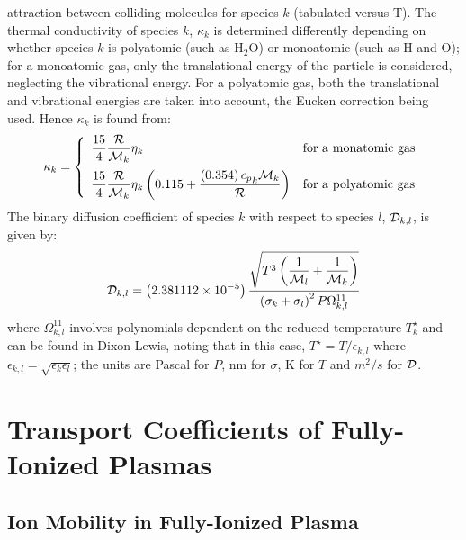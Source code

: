 \documentclass{warpdoc}
\newcommand{\cp}{{c_p}}
\newcommand{\mfd}{\displaystyle}
\begin{document}
attraction between colliding molecules for species $k$ (tabulated
versus T). The thermal conductivity of species $k$, $\kappa_k$ is determined
differently depending on whether
species $k$ is polyatomic (such as H$_2$O) or monoatomic
(such as H and O); for a monoatomic gas, only the
translational energy of the particle is considered,
neglecting the vibrational energy. For a polyatomic gas,
both the translational and vibrational energies are taken into
account, the Eucken correction being used. Hence $\kappa_k$
is found from:
%
\begin{equation}
\kappa_k = \left\{ \begin{array}{ll}
\vspace{0.2cm}
\mfd\frac{15}{4} \mfd\frac{\cal R}{{\cal M}_k} \eta_k & {\rm for~a~monatomic~gas} \\
\mfd\frac{15}{4} \mfd\frac{\cal R}{{\cal M}_k} \eta_k \left(  0.115 +
   \mfd\frac{ \left( 0.354 \right) {\cp}_k{\cal M}_k}{\cal R}  \right)
        & {\rm for~a~polyatomic~gas} \\
\end{array}
\right.
\label{eqn:moltherm-kappa}
\end{equation}
%
The binary diffusion coefficient of species $k$ with respect to species $l$,
${\cal D}_{k,l}$, is given by:
%
\begin{equation}
{\cal D}_{k,l}=\left( 2.381112 \times 10^{-5} \right) \frac{\sqrt{T^3 \mfd  \left(\frac{1}{{\cal M}_l} + \frac{1}{{\cal M}_k} \right)}}
              {  \left( \sigma_k + \sigma_l \right)^2 P \Omega^{11}_{k,l}}
\label{eqn:moldiff-binary}
\end{equation}
%
where $\Omega^{11}_{k,l}$ involves
polynomials dependent on the reduced temperature $T^\star_k$
and can be found in Dixon-Lewis, noting that in this case, $T^\star=T/\epsilon_{k,l}$
where $\epsilon_{k,l}=\sqrt{\epsilon_k \epsilon_l}$; the units are Pascal for $P$, nm for $\sigma$,
K for $T$ and $m^2/s$ for $\cal D$.




\section{Transport Coefficients of Fully-Ionized Plasmas}



\subsection{Ion Mobility in Fully-Ionized Plasma}
\end{document}
